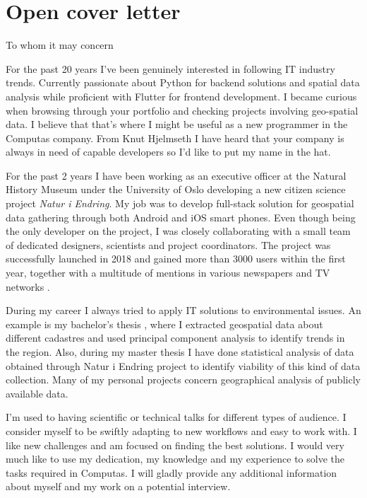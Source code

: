 \section*{Open cover letter}
To whom it may concern
\par
For the past 20 years I’ve been genuinely interested in following IT industry trends. Currently passionate about Python for backend solutions and spatial data analysis while proficient with Flutter for frontend development. I became curious when browsing through your portfolio and checking projects involving geo-spatial data. I believe that that’s where I might be useful as a new programmer in the Computas company. From Knut Hjelmseth I have heard that your company is always in need of capable developers so I’d like to put my name in the hat.
  \par
  For the past 2 years I have been working as an executive officer at the Natural History Museum under the University of Oslo developing a new citizen science project \textit{Natur i Endring}. My job was to develop full-stack solution for geospatial data gathering through both Android and iOS smart phones. Even though being the only developer on the project, I was closely collaborating with a small team of dedicated designers, scientists and project coordinators. The project was successfully launched in 2018 and gained more than 3000 users within the first year, together with a multitude of mentions in various newspapers and TV networks \cite{newspaper1,newspaper2,newspaper3,newspaper4,newspaper5,tv1,tv2}. 
  \par
  During my career I always tried to apply IT solutions to environmental issues. An example is my bachelor’s thesis \cite{Torma_Solár_2015}, where I extracted geospatial data about different cadastres and used principal component analysis to identify trends in the region. Also, during my master thesis \cite{msc} I have done statistical analysis of data obtained through Natur i Endring project to identify viability of this kind of data collection. Many of my personal projects concern geographical analysis of publicly available data. 
\par
I’m used to having scientific or technical talks for different types of audience. I consider myself to be swiftly adapting to new workflows and easy to work with. I like new challenges and am focused on finding the best solutions. I would very much like to use my dedication, my knowledge and my experience to solve the tasks required in Computas. I will gladly provide any additional information about myself and my work on a potential interview.